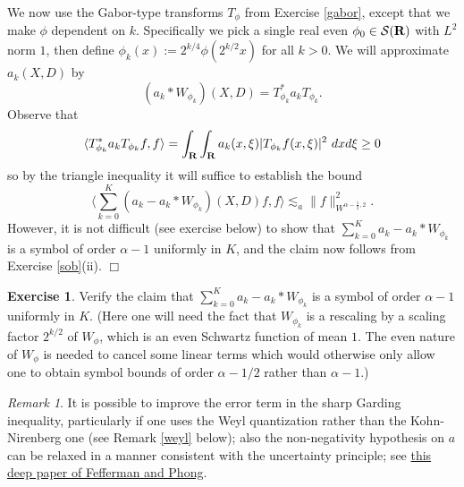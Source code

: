 \documentclass[11pt]{article}
\theoremstyle{definition}
\newtheorem{exercise}[theorem]{Exercise}
\theoremstyle{remark}
\newtheorem{remark}[theorem]{Remark}
\begin{document}
We now use the Gabor-type transforms \({T_\phi}\) from Exercise \ref{gabor}, except that we make \({\phi}\) dependent on \({k}\). Specifically we pick a single real even \({\phi_0 \in {\mathcal S}({\bf R})}\) with \({L^2}\) norm \({1}\), then define \({\phi_k(x) := 2^{k/4} \phi(2^{k/2} x)}\) for all \({k>0}\). We will approximate \({a_k(X,D)}\) by 
\[\displaystyle  (a_k * W_{\phi_k})(X,D) = T_{\phi_k}^* a_k T_{\phi_k}.\]
 Observe that 
\[\displaystyle  \langle T_{\phi_k}^* a_k T_{\phi_k} f, f \rangle = \int_{\bf R} \int_{\bf R} a_k(x,\xi) |T_{\phi_k}f(x,\xi)|^2\ dx d\xi \geq 0\]
 so by the triangle inequality it will suffice to establish the bound 
\[\displaystyle  \langle \sum_{k=0}^K (a_k - a_k * W_{\phi_k})(X,D) f, f \rangle \lesssim_a \|f\|_{W^{\alpha-\frac{1}{2},2}}^2.\]
 However, it is not difficult (see exercise below) to show that \({\sum_{k=0}^K a_k - a_k * W_{\phi_k}}\) is a symbol of order \({\alpha-1}\) uniformly in \({K}\), and the claim now follows from Exercise \ref{sob}(ii). \(\Box\)
\begin{exercise}
  Verify the claim that \({\sum_{k=0}^K a_k - a_k * W_{\phi_k}}\) is a symbol of order \({\alpha-1}\) uniformly in \({K}\). (Here one will need the fact that \({W_{\phi_k}}\) is a rescaling by a scaling factor \({2^{k/2}}\) of \({W_\phi}\), which is an even Schwartz function of mean \({1}\). The even nature of \({W_\phi}\) is needed to cancel some linear terms which would otherwise only allow one to obtain symbol bounds of order \({\alpha-1/2}\) rather than \({\alpha-1}\).) 
\end{exercise}
\begin{remark}
  It is possible to improve the error term in the sharp Garding inequality, particularly if one uses the Weyl quantization rather than the Kohn-Nirenberg one (see Remark \ref{weyl} below); also the non-negativity hypothesis on \({a}\) can be relaxed in a manner consistent with the uncertainty principle; see \href{https://mathscinet.ams.org/mathscinet-getitem?mr=611747}{this deep paper of Fefferman and Phong}. 
\end{remark}
\end{document}
